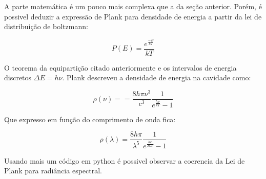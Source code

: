\documentclass[11pt]{article}
\begin{document}
A parte matemática é um pouco mais complexa que a da seção anterior.
Porém, é possivel deduzir a expressão de Plank para densidade de energia
a partir da lei de distribuição de boltzmann:

\[
P(E)=\frac{e^{\frac{-E}{kT}}}{kT}
\]

O teorema da equipartição citado anteriormente e os intervalos de
energia discretos \(\Delta E=h\nu\). Plank descreveu a densidade de
energia na cavidade como:

\[
\rho(\nu)==\frac{8 h \pi \nu^3}{c^3}\frac{1}{e^{\frac{h\nu}{kT}}-1}
\]

Que expresso em função do comprimento de onda fica:

\[
\rho(\lambda)=\frac{8 h \pi}{\lambda^5}\frac{1}{e^{\frac{hc}{\lambda kT}}-1}
\]

Usando mais um código em python é possivel observar a coerencia da Lei
de Plank para radiância espectral.
\end{document}
